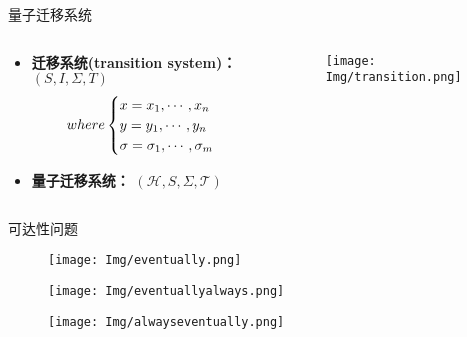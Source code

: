 \documentclass[aspectratio=1610]{ctexbeamer}
\begin{document}
\begin{frame}{量子迁移系统}
    \begin{columns}[T] %

        \begin{column}{.6\textwidth}
            \begin{itemize}
                \item  \textbf{迁移系统(transition system)：} $(S, I, \Sigma, T)$
                \begin{equation}
                  where
                  \begin{cases}
                    x = x_1, \cdots, x_n\\
                    y = y_1, \cdots, y_n\\
                    \sigma = \sigma_1, \cdots, \sigma_m
                  \end{cases}
                  \notag
                \end{equation}
                \item \textbf{量子迁移系统：} $(\mathcal{H},S,\Sigma,\mathcal{T})$
            \end{itemize}
        \end{column}
    
        \begin{column}{.3\textwidth}
          \begin{figure}
            \centering
            \texttt{[image: Img/transition.png]}
          \end{figure}
        \end{column}
    
      \end{columns}
\end{frame}
\begin{frame}{可达性问题}
    \begin{figure}
        \texttt{[image: Img/eventually.png]}
    \end{figure}
    \begin{figure}
        \texttt{[image: Img/eventuallyalways.png]}
    \end{figure}
    \begin{figure}
        \texttt{[image: Img/alwayseventually.png]}
    \end{figure}
  \end{frame}
\end{document}
